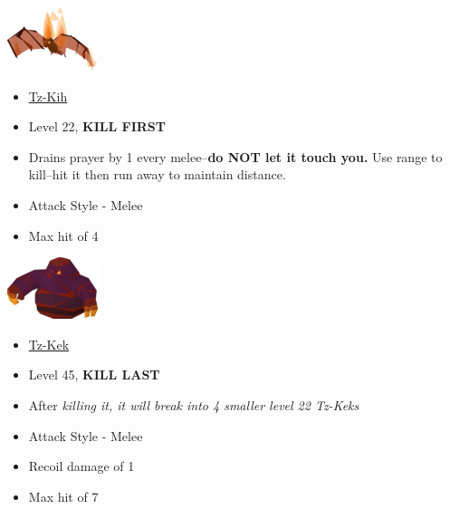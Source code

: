 \documentclass{article}
\begin{document}
\begin{multicols}{2}
  \null \vfill
  \includegraphics[width=.3\textwidth]{tzkih.png}
  \vfill \null
\columnbreak
  \null \vfill
  \begin{itemize}
    \item \underline{Tz-Kih}
    \item Level 22, \textbf{KILL FIRST}
    \item Drains prayer by 1 every melee--\textbf{do NOT let it touch you.} Use range to kill--hit it then run away to maintain distance.
    \item Attack Style - Melee
    \item Max hit of 4
  \end{itemize}
  \vfill \null
\end{multicols}

\begin{multicols}{2}
  \null \vfill
  \includegraphics[width=.3\textwidth]{tzkek.png}
  \vfill \null
\columnbreak
  \null \vfill
  \begin{itemize}
    \item \underline{Tz-Kek}
    \item Level 45, \textbf{KILL LAST}
    \item After \textit{killing it, it will break into 4 smaller level 22 Tz-Keks}
    \item Attack Style - Melee
    \item Recoil damage of 1
    \item Max hit of 7
  \end{itemize}
  \vfill \null
\end{multicols}
\end{document}
